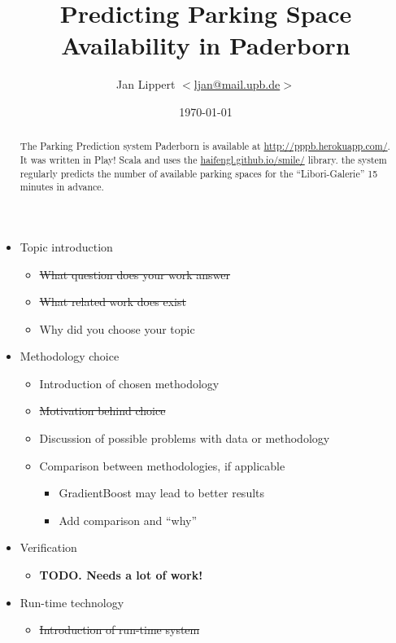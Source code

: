 \documentclass[journal,10pt]{IEEEtran}
\author{Jan Lippert \(<\)\href{mailto:ljan@mail.upb.de}{ljan@mail.upb.de}\(>\)}
\date{\today}
\begin{document}
\title{Predicting Parking Space Availability in Paderborn}
\maketitle

\begin{abstract}
The Parking Prediction system Paderborn is available at \url{http://pppb.herokuapp.com/}. It was written in Play! Scala and uses the \href{smile}{haifengl.github.io/smile/} library. the system regularly predicts the number of available parking spaces for the ``Libori-Galerie'' 15 minutes in advance.
\end{abstract}

\tableofcontents
\begin{itemize}
  \item Topic introduction
  \begin{itemize}
    \item \st{What question does your work answer}
    \item \st{What related work does exist}
    \item Why did you choose your topic
  \end{itemize}
  \item Methodology choice
  \begin{itemize}
    \item Introduction of chosen methodology
    \item \st{Motivation behind choice}
    \item Discussion of possible problems with data or methodology
    \item Comparison between methodologies, if applicable
    \begin{itemize}
      \item GradientBoost may lead to better results
      \item Add comparison and ``why''
    \end{itemize}
  \end{itemize}
  \item Verification
  \begin{itemize}
  	\item \textbf{TODO. Needs a lot of work!}
  \end{itemize}
  \item Run-time technology
  \begin{itemize}
    \item \st{Introduction of run-time system}

\end{itemize}
\end{itemize}
\end{document}
